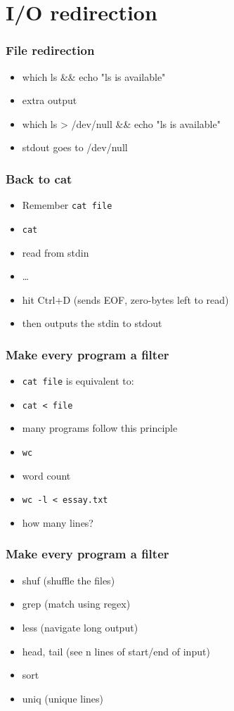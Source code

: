 \documentclass[%
        hyperref={%
                pdfauthor={Zakariyya Mughal},%
                pdfpagemode={None},pdfpagelayout={SinglePage}}%
        xcolor={x11names},%
]{beamer}
\begin{document}
\section{I/O redirection}\frame{\insertsection}
\begin{frame}
	\frametitle{File redirection}
	\begin{itemize}
		\item which ls \&\& echo "ls is available"
		\pause\item extra output
		\pause\item which ls > /dev/null \&\& echo "ls is available"
		\pause\item stdout goes to /dev/null
	\end{itemize}
\end{frame}
\begin{frame}
	\frametitle{Back to cat}
	\begin{itemize}
		\item Remember \texttt{cat file}
		\pause\item \texttt{cat}
		\item read from stdin
		\item \ldots
		\pause\item hit Ctrl+D (sends EOF, zero-bytes left to
			read)
		\pause\item then outputs the stdin to stdout
	\end{itemize}
\end{frame}
\begin{frame}
	\frametitle{Make every program a filter}
	\begin{itemize}
		\item \texttt{cat file} is equivalent to:
		\item \texttt{cat < file}
		\item many programs follow this principle
		\pause\item \texttt{wc}
		\item word count
		\pause\item \texttt{wc -l < essay.txt}
		\item how many lines?
	\end{itemize}
\end{frame}
\begin{frame}
	\frametitle{Make every program a filter}
	\begin{itemize}
		\item shuf (shuffle the files)
		\item grep (match using regex)
		\item less (navigate long output)
		\item head, tail (see n lines of start/end of input)
		\item sort
		\item uniq (unique lines)
	\end{itemize}
\end{frame}
\end{document}
